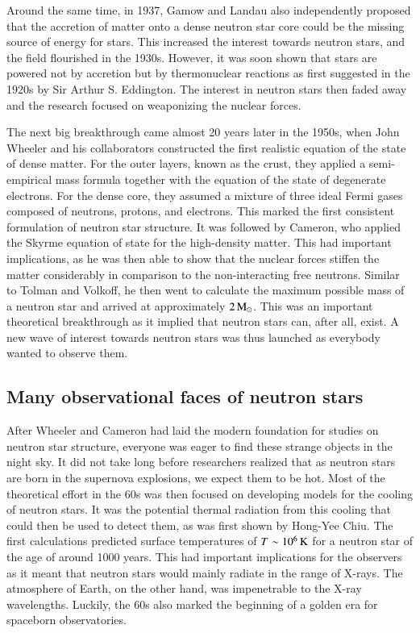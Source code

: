 Around the same time, in 1937, Gamow and Landau also independently proposed that the accretion of matter onto a dense neutron star core could be the missing source of energy for stars.
This increased the interest towards neutron stars, and the field flourished in the 1930s.
However, it was soon shown that stars are powered not by accretion but by thermonuclear reactions as first suggested in the 1920s by Sir Arthur S. Eddington.\cite{Eddington26}
The interest in neutron stars then faded away and the research focused on weaponizing the nuclear forces.


The next big breakthrough came almost 20 years later in the 1950s, when John Wheeler and his collaborators constructed the first realistic equation of the state of dense matter\cite{Wheeler66}.
For the outer layers, known as the crust, they applied a semi-empirical mass formula together with the equation of the state of degenerate electrons.
For the dense core, they assumed a mixture of three ideal Fermi gases composed of neutrons, protons, and electrons.
This marked the first consistent formulation of neutron star structure.
It was followed by Cameron, who applied the Skyrme equation of state for the high-density matter.\cite{Cameron59}
This had important implications, as he was then able to show that the nuclear forces stiffen the matter considerably in comparison to the non-interacting free neutrons.
Similar to Tolman and Volkoff, he then went to calculate the maximum possible mass of a neutron star and arrived at approximately $2\, \mathrm{M}_{\odot}$.
This was an important theoretical breakthrough as it implied that neutron stars can, after all, exist.
A new wave of interest towards neutron stars was thus launched as everybody wanted to observe them.


\subsection{Many observational faces of neutron stars}

After Wheeler and Cameron had laid the modern foundation for studies on neutron star structure, everyone was eager to find these strange objects in the night sky.
It did not take long before researchers realized that as neutron stars are born in the supernova explosions, we expect them to be hot.
Most of the theoretical effort in the 60s was then focused on developing models for the cooling of neutron stars.\cite{Stabler60, Chiu64, Morton64, CS64, BW65a, BW65b, TC66}
It was the potential thermal radiation from this cooling that could then be used to detect them, as was first shown by Hong-Yee Chiu\cite{Chiu64}.
The first calculations predicted surface temperatures of $T \sim 10^6 \, \mathrm{K}$ for a neutron star of the age of around 1000 years.
This had important implications for the observers as it meant that neutron stars would mainly radiate in the range of X-rays.
The atmosphere of Earth, on the other hand, was impenetrable to the X-ray wavelengths.
Luckily, the 60s also marked the beginning of a golden era for spaceborn observatories.

